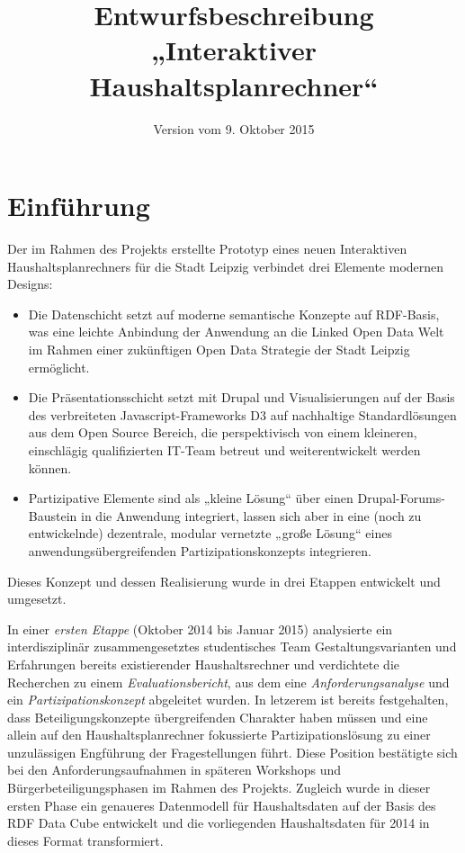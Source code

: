 \documentclass[a4paper,11pt,twoside]{article}
\title{Entwurfsbeschreibung „Interaktiver Haushaltsplanrechner“}
\date{Version vom 9. Oktober 2015}
\begin{document}
\maketitle
\tableofcontents
\newpage
\seitezwei
\newpage

\section{Einführung}

Der im Rahmen des Projekts erstellte Prototyp eines neuen Interaktiven
Haushaltsplanrechners für die Stadt Leipzig verbindet drei Elemente modernen
Designs:
\begin{itemize}
\item Die Datenschicht setzt auf moderne semantische Konzepte auf RDF-Basis,
  was eine leichte Anbindung der Anwendung an die Linked Open Data Welt im
  Rahmen einer zukünftigen Open Data Strategie der Stadt Leipzig ermöglicht. 
\item Die Präsentationsschicht setzt mit Drupal und Visualisierungen auf der
  Basis des verbreiteten Javascript-Frameworks D3 auf nachhaltige
  Standardlösungen aus dem Open Source Bereich, die perspektivisch von einem
  kleineren, einschlägig qualifizierten IT-Team betreut und weiterentwickelt
  werden können.
\item Partizipative Elemente sind als „kleine Lösung“ über einen
  Drupal-Forums-Baustein in die Anwendung integriert, lassen sich aber in eine
  (noch zu entwickelnde) dezentrale, modular vernetzte „große Lösung“ eines
  anwendungsübergreifenden Partizipationskonzepts integrieren.
\end{itemize}
Dieses Konzept und dessen Realisierung wurde in drei Etappen entwickelt und
umgesetzt.

In einer \emph{ersten Etappe} (Oktober 2014 bis Januar 2015) analysierte ein
interdisziplinär zusammengesetztes studentisches Team Gestaltungsvarianten und
Erfahrungen bereits existierender Haushaltsrechner und verdichtete die
Recherchen zu einem \emph{Evaluationsbericht}, aus dem eine
\emph{Anforderungsanalyse} und ein \emph{Partizipationskonzept} abgeleitet
wurden.  In letzerem ist bereits festgehalten, dass Beteiligungskonzepte
übergreifenden Charakter haben müssen und eine allein auf den
Haushaltsplanrechner fokussierte Partizipationslösung zu einer unzulässigen
Engführung der Fragestellungen führt. Diese Position bestätigte sich bei den
Anforderungsaufnahmen in späteren Workshops und Bürgerbeteiligungsphasen im
Rahmen des Projekts.  Zugleich wurde in dieser ersten Phase ein genaueres
Datenmodell für Haushaltsdaten auf der Basis des RDF Data Cube entwickelt und
die vorliegenden Haushaltsdaten für 2014 in dieses Format transformiert.
\end{document}
